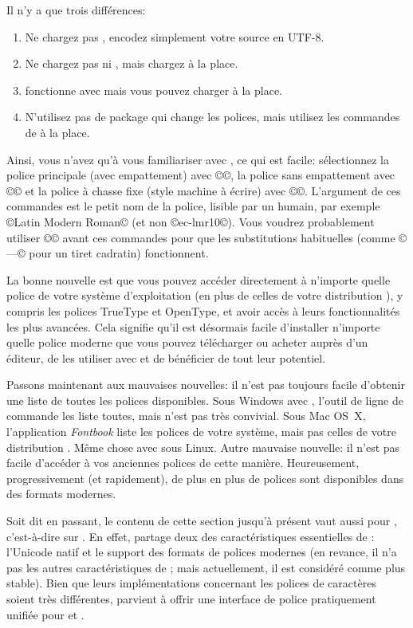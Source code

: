 \documentclass{lltxdoc}
\begin{document}
Il n'y a que trois différences:
\begin{enumerate}
  \item Ne chargez pas , encodez simplement votre source en UTF-8.
  \item Ne chargez pas  ni , mais chargez 
     à la place.
  \item {} fonctionne avec \lualatex mais vous pouvez charger 
     à la place.
  \item N'utilisez pas de package qui change les polices, mais utilisez les commandes
    de  à la place.
\end{enumerate}
Ainsi, vous n'avez qu'à vous familiariser avec , ce qui est facile:
sélectionnez la police principale (avec empattement) avec ©\setmainfont©,
la police sans empattement avec ©\setsansfont© et la police à chasse fixe
(style machine à écrire) avec ©\setmonofont©. L'argument de ces commandes est
le petit nom de la police, lisible par un humain, par exemple ©Latin Modern Roman©
(et non ©ec-lmr10©). Vous voudrez probablement utiliser ©©
avant ces commandes pour que les substitutions \tex habituelles
(comme ©---© pour un tiret cadratin) fonctionnent.

La bonne nouvelle est que vous pouvez accéder directement à n'importe quelle
police de votre système d'exploitation (en plus de celles de votre distribution \tex),
y compris les polices TrueType et OpenType, et avoir accès à leurs fonctionnalités
les plus avancées. Cela signifie qu'il est désormais facile d'installer n'importe
quelle police moderne que vous pouvez télécharger ou acheter auprès d'un éditeur,
de les utiliser avec \lualatex et de bénéficier de tout leur potentiel.

Passons maintenant aux mauvaises nouvelles: il n'est pas toujours facile d'obtenir
une liste de toutes les polices disponibles. Sous Windows avec \texlive, l'outil
de ligne de commande  les liste toutes, mais n'est pas très convivial.
Sous Mac OS~X, l'application \emph{Fontbook} liste les polices de votre système,
mais pas celles de votre distribution \tex. Même chose avec  sous Linux.
Autre mauvaise nouvelle: il n'est pas facile d'accéder à vos anciennes polices
de cette manière. Heureusement, progressivement (et rapidement), de plus en plus
de polices sont disponibles dans des formats modernes.

Soit dit en passant, le contenu de cette section jusqu'à présent vaut aussi pour
\xelatex, c'est-à-dire \latex sur \xetex. En effet, \xetex partage deux des
caractéristiques essentielles de \luatex: l'Unicode natif et le support des formats
de polices modernes (en revance, il n'a pas les autres caractéristiques de \luatex;
mais actuellement, il est considéré comme plus stable). Bien que leurs implémentations
concernant les polices de caractères soient très différentes,  parvient
à offrir une interface de police pratiquement unifiée pour \xelatex et \lualatex.
\end{document}
